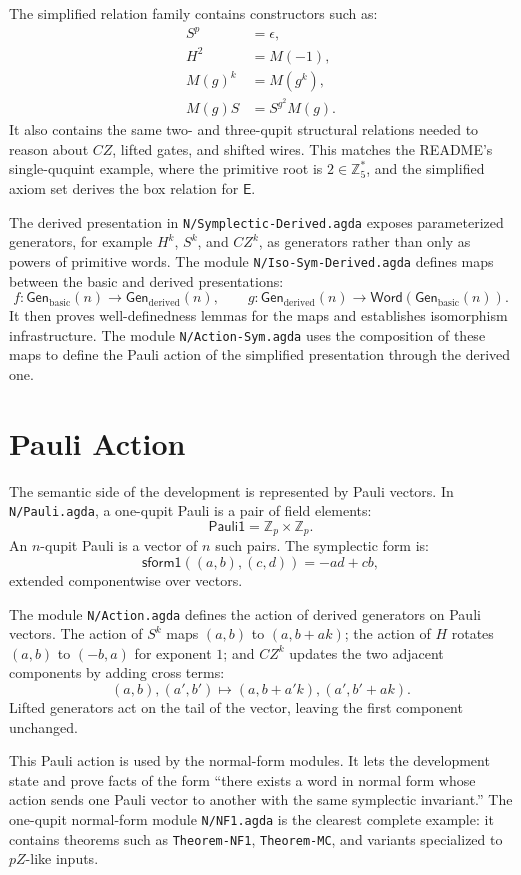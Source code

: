 \documentclass[sigplan,screen,review,anonymous]{acmart}
\newcommand{\Zp}{\mathbb{Z}_p}
\newcommand{\Word}{\mathsf{Word}}
\newcommand{\Gen}{\mathsf{Gen}}
\newcommand{\EBox}{\mathsf{E}}
\newcommand{\file}[1]{\texttt{#1}}
\begin{document}
The simplified relation family contains constructors such as:
\[
\begin{aligned}
S^p &= \epsilon,\\
H^2 &= M(-1),\\
M(g)^k &= M(g^k),\\
M(g)S &= S^{g^2}M(g).
\end{aligned}
\]
It also contains the same two- and three-qupit structural relations
needed to reason about \(CZ\), lifted gates, and shifted wires.  This
matches the README's single-ququint example, where the primitive root
is \(2 \in \mathbb{Z}_5^\ast\), and the simplified axiom set derives
the box relation for \(\EBox\).

The derived presentation in \file{N/Symplectic-Derived.agda} exposes
parameterized generators, for example \(H^k\), \(S^k\), and \(CZ^k\),
as generators rather than only as powers of primitive words.  The
module \file{N/Iso-Sym-Derived.agda} defines maps between the basic
and derived presentations:
\[
  f : \Gen_{\mathrm{basic}}(n) \to \Gen_{\mathrm{derived}}(n),
  \qquad
  g : \Gen_{\mathrm{derived}}(n) \to \Word(\Gen_{\mathrm{basic}}(n)).
\]
It then proves well-definedness lemmas for the maps and establishes
isomorphism infrastructure.  The module \file{N/Action-Sym.agda}
uses the composition of these maps to define the Pauli action of the
simplified presentation through the derived one.

\section{Pauli Action}

The semantic side of the development is represented by Pauli vectors.
In \file{N/Pauli.agda}, a one-qupit Pauli is a pair of field elements:
\[
  \mathsf{Pauli1} = \Zp \times \Zp.
\]
An \(n\)-qupit Pauli is a vector of \(n\) such pairs.  The symplectic
form is:
\[
  \mathsf{sform1}((a,b),(c,d)) = -a d + c b,
\]
extended componentwise over vectors.

The module \file{N/Action.agda} defines the action of derived
generators on Pauli vectors.  The action of \(S^k\) maps
\((a,b)\) to \((a,b+a k)\); the action of \(H\) rotates
\((a,b)\) to \((-b,a)\) for exponent \(1\); and \(CZ^k\) updates the
two adjacent components by adding cross terms:
\[
  (a,b),(a',b') \mapsto (a,b+a'k),(a',b'+ak).
\]
Lifted generators act on the tail of the vector, leaving the first
component unchanged.

This Pauli action is used by the normal-form modules.  It lets the
development state and prove facts of the form ``there exists a word in
normal form whose action sends one Pauli vector to another with the
same symplectic invariant.''  The one-qupit normal-form module
\file{N/NF1.agda} is the clearest complete example: it contains
theorems such as \texttt{Theorem-NF1}, \texttt{Theorem-MC}, and
variants specialized to \(pZ\)-like inputs.
\end{document}
